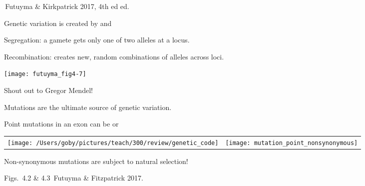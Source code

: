 \documentclass[t]{beamer}
\begin{document}


{
\begin{frame}[b]

	\tiny\hfill \textcopyright\,Futuyma \& Kirkpatrick 2017, 4th ed ed.
\end{frame}
}
%

\begin{frame}[t,plain]{Genetic variation is created by  and }

\begin{multicols}{2}

\hangpara Segregation: a gamete gets only one of two alleles at a locus.

\hangpara Recombination: creates new, random combinations of alleles across loci.

\columnbreak

\texttt{[image: futuyma\_fig4-7]}

\end{multicols}

\vfilll

\tiny Shout out to Gregor Mendel!

\end{frame}


{
\begin{frame}[b]{Mutations are the ultimate source of genetic variation.}
\end{frame}
}
%

\begin{frame}[t,plain]{Point mutations in an exon can be  or }

\begin{tabular}[t]{ll}
\texttt{[image: /Users/goby/pictures/teach/300/review/genetic\_code]} & \texttt{[image: mutation\_point\_nonsynonymous]}
\end{tabular}

\bigskip

Non-synonymous mutations are subject to natural selection!


\vfilll

\hfill Figs.~4.2 \& 4.3 \textcopyright\,Futuyma \& Fitzpatrick 2017.
\end{frame}
\end{document}

